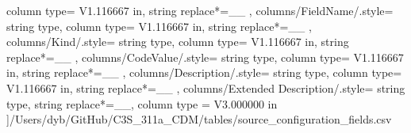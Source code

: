 \begin{landscape}
{            column type= V{1.116667 in}, 
            string replace*={_}{\_}
        },
    columns/FieldName/.style={
            string type, 
            column type= V{1.116667 in}, 
            string replace*={_}{\_}
        },
    columns/Kind/.style={
            string type, 
            column type= V{1.116667 in}, 
            string replace*={_}{\_}
        },
    columns/CodeValue/.style={
            string type, 
            column type= V{1.116667 in}, 
            string replace*={_}{\_}
        },
    columns/Description/.style={
            string type, 
            column type= V{1.116667 in}, 
            string replace*={_}{\_}
        },
    columns/Extended Description/.style={
            string type, 
            string replace*={_}{\_},
            column type = V{3.000000 in}
        }
    ]{/Users/dyb/GitHub/C3S_311a_CDM/tables/source_configuration_fields.csv}
\end{landscape}
